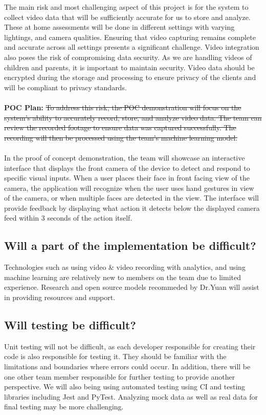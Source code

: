 \documentclass{article}
\begin{document}
 The main risk and most challenging aspect of this project is for the system to collect video data that will be sufficiently accurate for us to store and analyze. 
These at home assessments will be done in different settings with varying lightings, and camera qualities. Ensuring that video capturing remains complete and accurate across all settings presents a significant challenge.  Video integration also poses the risk of compromising data security. As we are handling videos of children and parents, it is important to maintain security. Video data should be encrypted during the storage and processing to ensure privacy of the clients and will be compliant to privacy standards. \\  
\\
\noindent \textbf{POC Plan:} \color{red}\sout{To address this risk, the POC demonstration will focus on the system's ability to accurately record, store, and analyze video data. The team can review the recorded footage to ensure data was captured successfully. The recording will then be processed using the team's machine learning  model.}
\color{black}\\\\
In the proof of concept demonstration, the team will showcase an interactive interface that displays the front 
camera of the device to detect and respond to specific visual inputs. When a user places their face in front 
facing view of the camera, the application will recognize when the user uses hand gestures in view of the camera, 
or when multiple faces are detected in the view. The interface will provide feedback by displaying what action it 
detects below the displayed camera feed within 3 seconds of the action itself. 

\subsection{Will a part of the implementation be difficult?}
Technologies such as using video \& video recording with analytics, and using machine learning are relatively new to members on the team due to limited experience. Research and open source models recommeded by Dr.Yuan will assist in providing resources and support. \\

\subsection{Will testing be difficult?} 
Unit testing will not be difficult, as each developer responsible for creating their code is also responsible for testing it. They should be familiar with the limitations and boundaries where errors could occur. In addition, there will be one other team member responsible for further testing to provide another perspective. We will also being using automated testing using CI and testing libraries including Jest and PyTest. Analyzing mock data as well as real data for final testing may be more challenging. \\
\end{document}
